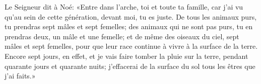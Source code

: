 Le Seigneur dit à Noé: «Entre dans l’arche, toi et toute ta famille,
	car j’ai vu qu’au sein de cette génération, devant moi, tu es juste.
De tous les animaux purs, tu prendras sept mâles et sept femelles;
	des animaux qui ne sont pas purs, tu en prendras deux,
		un mâle et une femelle;
	et de même des oiseaux du ciel, sept mâles et sept femelles,
	pour que leur race continue à vivre à la surface de la terre.
Encore sept jours, en effet, et je vais faire tomber la pluie sur la terre,
	pendant quarante jours et quarante nuits;
	j’effacerai de la surface du sol tous les êtres que j’ai faits.»
